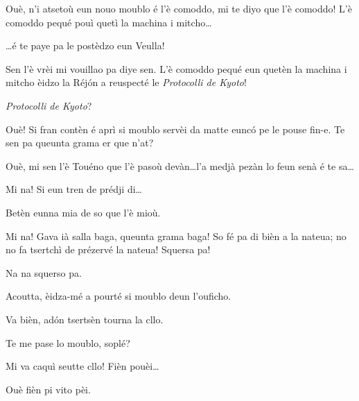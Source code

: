 \begin{drama}
\Richardspeaks Ouè, n'i atsetoù eun nouo moublo é l'è comoddo,  mi te diyo que l'è comoddo! L'è comoddo pequé pouì quetì la machina i mitcho\ldots

\Sandrinospeaks \ldots é te paye pa le postèdzo eun Veulla!

\Richardspeaks Sen l'è vrèi mi vouillao pa diye sen. L'è comoddo pequé eun quetèn la machina i mitcho èidzo la Réj\'on a reuspecté le \textit{Protocolli de Kyoto}! 

\Sandrinospeaks \textit{Protocolli de Kyoto}?

\Sandrinospeaks Ouè! Si fran contèn é aprì si moublo servèi da matte eunc\'o pe le pouse fin-e. Te sen pa  queunta grama er que n'at? 

\Sandrinospeaks Ouè, mi sen l'è Touéno que l'è pasoù devàn\ldots l'a medjà pezàn lo feun senà é te sa\ldots

\Richardspeaks Mi na! Si eun tren de prédji di\ldots


\Sandrinospeaks Betèn eunna mia de so que l'è mioù.

\Richardspeaks Mi na! Gava ià salla baga, queunta grama baga! So fé pa di bièn a la nateua; no no fa tsertchì de prézervé la nateua! Squersa pa!

\Sandrinospeaks Na na squerso pa.

\Richardspeaks Acoutta, èidza-mé a pourté si moublo deun l'ouficho.

\Sandrinospeaks Va bièn, ad\'on tsertsèn tourna la cllo.


\Richardspeaks Te me pase lo moublo, soplé?


\Sandrinospeaks{} Mi va caquì seutte cllo! Fièn pouèi\ldots


\Richardspeaks Ouè fièn pi vito pèi.




\end{drama}
